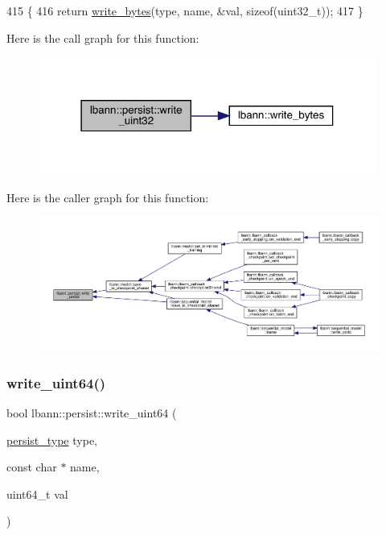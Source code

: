 \begin{DoxyCode}
415                                                                                  \{
416   \textcolor{keywordflow}{return} \hyperlink{classlbann_1_1persist_a8729c7c90f4ca3090cd678fce91a0eb0}{write\_bytes}(type, name, &val, \textcolor{keyword}{sizeof}(uint32\_t));
417 \}
\end{DoxyCode}
Here is the call graph for this function\+:\nopagebreak
\begin{figure}[H]
\begin{center}
\leavevmode
\includegraphics[width=315pt]{classlbann_1_1persist_a742334568de0aca958dbaf7bbabd3cba_cgraph}
\end{center}
\end{figure}
Here is the caller graph for this function\+:\nopagebreak
\begin{figure}[H]
\begin{center}
\leavevmode
\includegraphics[width=350pt]{classlbann_1_1persist_a742334568de0aca958dbaf7bbabd3cba_icgraph}
\end{center}
\end{figure}
\mbox{\label{classlbann_1_1persist_aced95e3bc711276b072af97b65ef9fc1}} 
\subsubsection{\texorpdfstring{write\+\_\+uint64()}{write\_uint64()}}
{\footnotesize\ttfamily bool lbann\+::persist\+::write\+\_\+uint64 (\begin{DoxyParamCaption}\item[{\hyperlink{namespacelbann_adee41f31f15f3906cbdcce4a1417eb56}{persist\+\_\+type}}]{type,  }\item[{const char $\ast$}]{name,  }\item[{uint64\+\_\+t}]{val }\end{DoxyParamCaption})}



